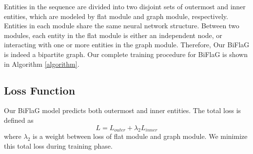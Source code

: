 \documentclass[11pt,a4paper]{article}
\begin{document}
Entities in the sequence are divided into two disjoint sets of outermost and inner entities, which are modeled by flat module and graph module, respectively.
Entities in each module share the same neural network structure.
Between two modules, each entity in the flat module is either an independent node, or interacting with one or more entities in the graph module. Therefore, Our BiFlaG is indeed a bipartite graph.
Our complete training procedure for BiFlaG is shown in Algorithm \ref{algorithm}.

\subsection{Loss Function}
Our BiFlaG model predicts both outermost and inner entities. 
The total loss is defined as
\begin{equation}
    L =  L_{outer} + \lambda_2 L_{inner}
\end{equation}
where $\lambda_2$ is a weight between loss of flat module and graph module. We minimize this total loss during training phase.
\end{document}
